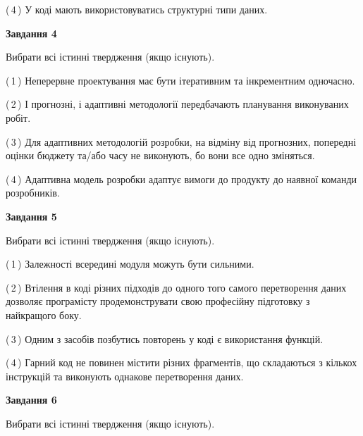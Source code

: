 \documentclass[10pt, ukrainian]{article}
\begin{document}
{\begin {large}
(\,4\,) У коді мають використовуватись структурні типи даних. %


{\begin {center}\textbf{Завдання 4}\end {center}}\par
Вибрати всі істинні твердження (якщо існують).\par
\vspace{2mm}



(\,1\,) Неперервне проектування має бути ітеративним та інкрементним одночасно. %



(\,2\,) І прогнозні, і адаптивні методології передбачають планування виконуваних робіт. %



(\,3\,) Для адаптивних методологій розробки, на відміну від прогнозних, попередні оцінки бюджету та/або часу не виконують, бо вони все одно зміняться. %



(\,4\,) Адаптивна модель розробки адаптує вимоги до продукту до наявної команди розробників. %


{\begin {center}\textbf{Завдання 5}\end {center}}\par
Вибрати всі істинні твердження (якщо існують).\par
\vspace{2mm}



(\,1\,) Залежності всередині модуля можуть бути сильними. %



(\,2\,) Втілення в коді різних підходів до одного того самого перетворення даних дозволяє програмісту продемонструвати свою професійну підготовку з найкращого боку. %



(\,3\,) Одним з засобів позбутись повторень у коді є використання функцій. %



(\,4\,) Гарний код не повинен містити різних фрагментів, що складаються з кількох інструкцій та виконують однакове перетворення даних. %

\newpage

{\begin {center}\textbf{Завдання 6}\end {center}}\par
Вибрати всі істинні твердження (якщо існують).\par
\vspace{2mm}




\end{large}}
\end{document}
